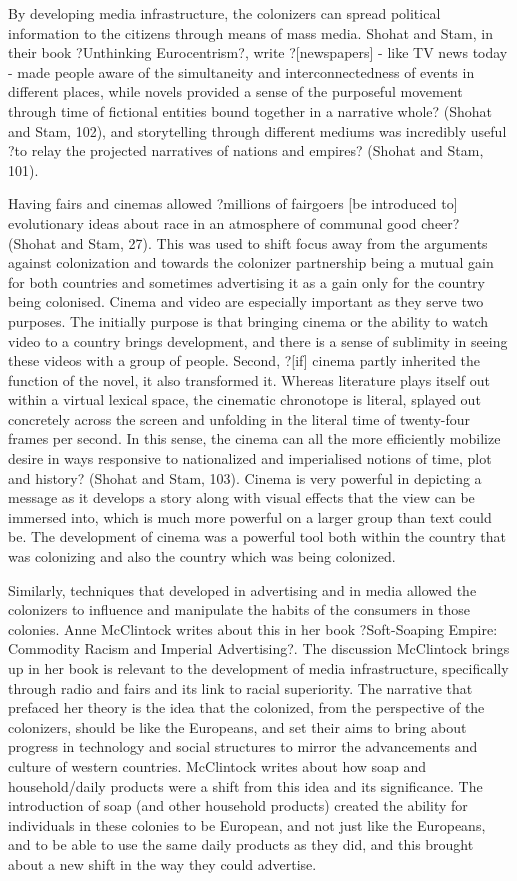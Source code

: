 \documentclass[12pt, oneside]{article}
\begin{document}
By developing media infrastructure, the colonizers can spread political information to the citizens through means of mass media. Shohat and Stam, in their book ?Unthinking Eurocentrism?, write ?[newspapers] - like TV news today - made people aware of the simultaneity and interconnectedness of events in different places, while novels provided a sense of the purposeful movement through time of fictional entities bound together in a narrative whole? (Shohat and Stam, 102), and storytelling through different mediums was incredibly useful ?to relay the projected narratives of nations and empires? (Shohat and Stam, 101). 
\par Having fairs and cinemas allowed ?millions of fairgoers [be introduced to] evolutionary ideas about race in an atmosphere of communal good cheer? (Shohat and Stam, 27). This was used to shift focus away from the arguments against colonization and towards the colonizer partnership being a mutual gain for both countries and sometimes advertising it as a gain only for the country being colonised. Cinema and video are especially important as they serve two purposes. The initially purpose is that bringing cinema or the ability to watch video to a country brings development, and there is a sense of sublimity in seeing these videos with a group of people. Second, ?[if] cinema partly inherited the function of the novel, it also transformed it. Whereas literature plays itself out within a virtual lexical space, the cinematic chronotope is literal, splayed out concretely across the screen and unfolding in the literal time of twenty-four frames per second. In this sense, the cinema can all the more efficiently mobilize desire in ways responsive to nationalized and imperialised notions of time, plot and history? (Shohat and Stam, 103). Cinema is very powerful in depicting a message as it develops a story along with visual effects that the view can be immersed into, which is much more powerful on a larger group than text could be. The development of cinema was a powerful tool both within the country that was colonizing and also the country which was being colonized.
\par Similarly, techniques that developed in advertising and in media allowed the colonizers to influence and manipulate the habits of the consumers in those colonies. Anne McClintock writes about this in her book ?Soft-Soaping Empire: Commodity Racism and Imperial Advertising?. The discussion McClintock brings up in her book is relevant to the development of media infrastructure, specifically through radio and fairs and its link to racial superiority. The narrative that prefaced her theory is the idea that the colonized, from the perspective of the colonizers, should be like the Europeans, and set their aims to bring about progress in technology and social structures to mirror the advancements and culture of western countries. McClintock writes about how soap and household/daily products were a shift from this idea and its significance. The introduction of soap (and other household products) created the ability for individuals in these colonies to be European, and not just like the Europeans, and to be able to use the same daily products as they did, and this brought about a new shift in the way they could advertise. 
\end{document}
